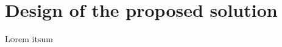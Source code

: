\chapter{Design of the proposed solution}
\label{ch:DesignOfTheProposedSolution}

\lettrine[lraise=-0.1, lines=2, loversize=0.2]{L}{o}rem itsum

